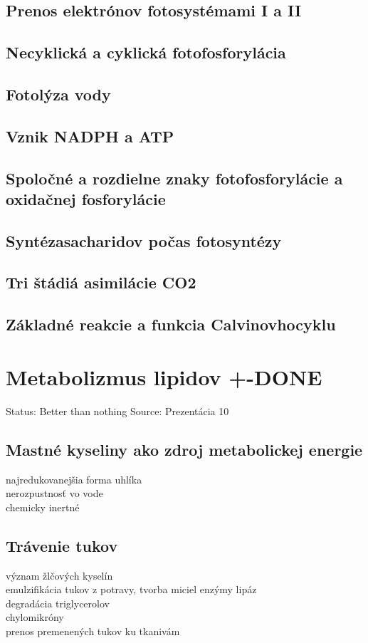 \subsection*{Prenos elektrónov fotosystémami I a II}
\subsection*{Necyklická a cyklická fotofosforylácia}
\subsection*{Fotolýza vody}
\subsection*{Vznik NADPH a ATP}
\subsection*{Spoločné a rozdielne znaky fotofosforylácie a oxidačnej fosforylácie}
\subsection*{Syntézasacharidov počas fotosyntézy}
\subsection*{Tri štádiá asimilácie CO2}
\subsection*{Základné reakcie a funkcia Calvinovhocyklu}
\section{Metabolizmus lipidov +-DONE}

Status: Better than nothing
Source: Prezentácia 10

\subsection*{Mastné kyseliny ako zdroj metabolickej energie}
najredukovanejšia forma uhlíka\\
nerozpustnosť vo vode\\
chemicky inertné\\
\subsection*{Trávenie tukov}
význam žlčových kyselín\\
\tab emulzifikácia tukov z potravy, tvorba miciel
enzýmy lipáz\\
\tab degradácia triglycerolov\\
chylomikróny\\
\tab prenos premenených tukov ku tkanivám\\
